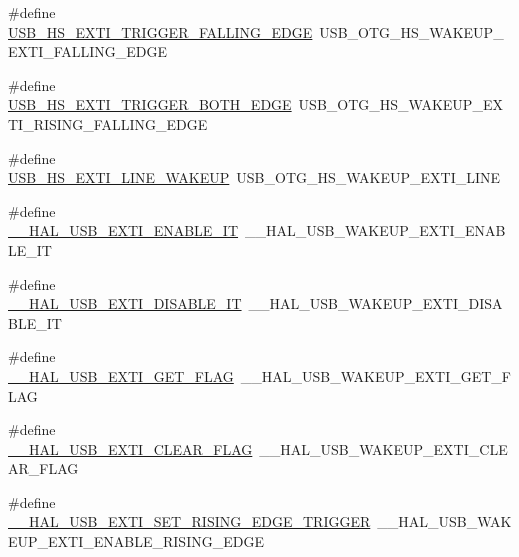 \begin{DoxyCompactItemize}
\item 
\#define \hyperlink{group___h_a_l___u_s_b___aliased___macros_gacf7c7cd4c0acdaef836d1381884eafdc}{U\+S\+B\+\_\+\+H\+S\+\_\+\+E\+X\+T\+I\+\_\+\+T\+R\+I\+G\+G\+E\+R\+\_\+\+F\+A\+L\+L\+I\+N\+G\+\_\+\+E\+D\+GE}~U\+S\+B\+\_\+\+O\+T\+G\+\_\+\+H\+S\+\_\+\+W\+A\+K\+E\+U\+P\+\_\+\+E\+X\+T\+I\+\_\+\+F\+A\+L\+L\+I\+N\+G\+\_\+\+E\+D\+GE
\item 
\#define \hyperlink{group___h_a_l___u_s_b___aliased___macros_ga88242c33988234109ab398a9195f6c11}{U\+S\+B\+\_\+\+H\+S\+\_\+\+E\+X\+T\+I\+\_\+\+T\+R\+I\+G\+G\+E\+R\+\_\+\+B\+O\+T\+H\+\_\+\+E\+D\+GE}~U\+S\+B\+\_\+\+O\+T\+G\+\_\+\+H\+S\+\_\+\+W\+A\+K\+E\+U\+P\+\_\+\+E\+X\+T\+I\+\_\+\+R\+I\+S\+I\+N\+G\+\_\+\+F\+A\+L\+L\+I\+N\+G\+\_\+\+E\+D\+GE
\item 
\#define \hyperlink{group___h_a_l___u_s_b___aliased___macros_ga76b8cf072166993b9e3094bb8c983265}{U\+S\+B\+\_\+\+H\+S\+\_\+\+E\+X\+T\+I\+\_\+\+L\+I\+N\+E\+\_\+\+W\+A\+K\+E\+UP}~U\+S\+B\+\_\+\+O\+T\+G\+\_\+\+H\+S\+\_\+\+W\+A\+K\+E\+U\+P\+\_\+\+E\+X\+T\+I\+\_\+\+L\+I\+NE
\item 
\#define \hyperlink{group___h_a_l___u_s_b___aliased___macros_ga8c010632fff5661d2424e4a656216044}{\+\_\+\+\_\+\+H\+A\+L\+\_\+\+U\+S\+B\+\_\+\+E\+X\+T\+I\+\_\+\+E\+N\+A\+B\+L\+E\+\_\+\+IT}~\+\_\+\+\_\+\+H\+A\+L\+\_\+\+U\+S\+B\+\_\+\+W\+A\+K\+E\+U\+P\+\_\+\+E\+X\+T\+I\+\_\+\+E\+N\+A\+B\+L\+E\+\_\+\+IT
\item 
\#define \hyperlink{group___h_a_l___u_s_b___aliased___macros_ga9ae38cfb5026c3868e5d9e9325ab801c}{\+\_\+\+\_\+\+H\+A\+L\+\_\+\+U\+S\+B\+\_\+\+E\+X\+T\+I\+\_\+\+D\+I\+S\+A\+B\+L\+E\+\_\+\+IT}~\+\_\+\+\_\+\+H\+A\+L\+\_\+\+U\+S\+B\+\_\+\+W\+A\+K\+E\+U\+P\+\_\+\+E\+X\+T\+I\+\_\+\+D\+I\+S\+A\+B\+L\+E\+\_\+\+IT
\item 
\#define \hyperlink{group___h_a_l___u_s_b___aliased___macros_ga6eac2b0cbade80df102638ce9eec5fff}{\+\_\+\+\_\+\+H\+A\+L\+\_\+\+U\+S\+B\+\_\+\+E\+X\+T\+I\+\_\+\+G\+E\+T\+\_\+\+F\+L\+AG}~\+\_\+\+\_\+\+H\+A\+L\+\_\+\+U\+S\+B\+\_\+\+W\+A\+K\+E\+U\+P\+\_\+\+E\+X\+T\+I\+\_\+\+G\+E\+T\+\_\+\+F\+L\+AG
\item 
\#define \hyperlink{group___h_a_l___u_s_b___aliased___macros_gabaf7fe70f4008c0b9a81a0032b7b38fb}{\+\_\+\+\_\+\+H\+A\+L\+\_\+\+U\+S\+B\+\_\+\+E\+X\+T\+I\+\_\+\+C\+L\+E\+A\+R\+\_\+\+F\+L\+AG}~\+\_\+\+\_\+\+H\+A\+L\+\_\+\+U\+S\+B\+\_\+\+W\+A\+K\+E\+U\+P\+\_\+\+E\+X\+T\+I\+\_\+\+C\+L\+E\+A\+R\+\_\+\+F\+L\+AG
\item 
\#define \hyperlink{group___h_a_l___u_s_b___aliased___macros_gaef664a7c509860ae0f3a1abb427cf4f7}{\+\_\+\+\_\+\+H\+A\+L\+\_\+\+U\+S\+B\+\_\+\+E\+X\+T\+I\+\_\+\+S\+E\+T\+\_\+\+R\+I\+S\+I\+N\+G\+\_\+\+E\+D\+G\+E\+\_\+\+T\+R\+I\+G\+G\+ER}~\+\_\+\+\_\+\+H\+A\+L\+\_\+\+U\+S\+B\+\_\+\+W\+A\+K\+E\+U\+P\+\_\+\+E\+X\+T\+I\+\_\+\+E\+N\+A\+B\+L\+E\+\_\+\+R\+I\+S\+I\+N\+G\+\_\+\+E\+D\+GE

\end{DoxyCompactItemize}
